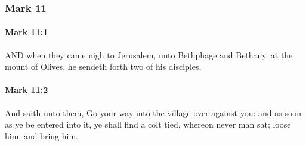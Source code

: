 	\subsubsection{Mark 11} %
		\label{MARK-11}
		
		\paragraph{Mark 11:1} %
			\label{MARK-11-1}

			AND when they came nigh to Jerusalem, unto Bethphage and Bethany, at the mount of Olives, he sendeth forth two of his disciples,

			\begin{framed}
			\scriptsize
				\begin{compactdesc}
					\item[SBLG] 
				\end{compactdesc}
			\end{framed}

		\paragraph{Mark 11:2} %
			\label{MARK-11-2}

			And saith unto them, Go your way into the village over against you: and as soon as ye be entered into it, ye shall find a colt tied, whereon never man sat; loose him, and bring him.

